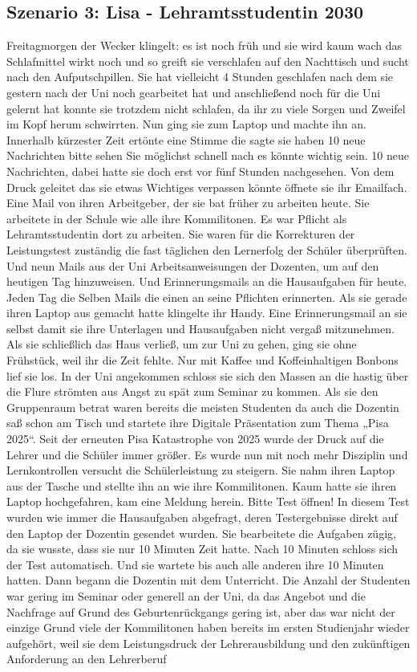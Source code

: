 \documentclass[12pt,a4paper]{article}
\begin{document}
\begin{appendix}
\section{Szenario 3: Lisa - Lehramtsstudentin 2030}
Freitagmorgen der Wecker klingelt: es ist noch früh und sie wird kaum wach das Schlafmittel wirkt noch und so greift sie verschlafen auf den Nachttisch und sucht nach den Aufputschpillen. Sie hat vielleicht 4 Stunden geschlafen nach dem sie gestern nach der Uni noch gearbeitet hat und anschließend noch für die Uni gelernt hat konnte sie trotzdem nicht schlafen, da ihr zu viele Sorgen und Zweifel im Kopf herum schwirrten. Nun ging sie zum Laptop und machte ihn an. Innerhalb kürzester Zeit ertönte eine Stimme die sagte sie haben 10 neue Nachrichten bitte sehen Sie möglichst schnell nach es könnte wichtig sein.  10 neue Nachrichten, dabei hatte sie doch erst vor fünf Stunden nachgesehen.  Von dem Druck geleitet das sie etwas Wichtiges verpassen könnte öffnete sie ihr Emailfach. Eine Mail von ihren Arbeitgeber, der sie bat früher zu arbeiten heute.  Sie arbeitete in der Schule wie alle ihre Kommilitonen. Es war Pflicht als Lehramtsstudentin dort zu arbeiten. Sie waren für die Korrekturen der Leistungstest zuständig die fast täglichen den Lernerfolg der Schüler überprüften. Und neun Mails aus der Uni Arbeitsanweisungen der Dozenten, um auf den heutigen Tag hinzuweisen. Und Erinnerungsmails an die Hausaufgaben für heute. Jeden Tag die Selben Mails die einen  an seine Pflichten erinnerten. Als sie gerade ihren Laptop aus gemacht hatte klingelte ihr Handy. Eine Erinnerungsmail an sie selbst damit sie ihre Unterlagen und Hausaufgaben nicht vergaß mitzunehmen. Als sie schließlich das Haus verließ, um zur Uni zu gehen, ging sie ohne Frühstück, weil ihr die Zeit fehlte. Nur mit Kaffee und Koffeinhaltigen Bonbons lief sie los. In der Uni angekommen schloss sie sich den Massen an die hastig über die Flure strömten aus Angst zu spät zum Seminar zu kommen.  Als sie den Gruppenraum betrat waren bereits die meisten Studenten da auch die Dozentin saß schon am Tisch und startete ihre Digitale Präsentation zum Thema „Pisa 2025“. Seit der erneuten Pisa Katastrophe von 2025 wurde der Druck auf die Lehrer und die Schüler immer größer. Es wurde nun mit noch mehr Disziplin und Lernkontrollen versucht die Schülerleistung zu steigern. Sie nahm ihren Laptop aus der Tasche und stellte ihn an wie ihre Kommilitonen.  Kaum hatte sie ihren Laptop hochgefahren, kam eine Meldung herein. Bitte Test öffnen! In diesem Test wurden wie immer die Hausaufgaben abgefragt, deren Testergebnisse  direkt auf den Laptop der Dozentin gesendet wurden.  Sie bearbeitete die Aufgaben zügig, da sie wusste, dass sie nur 10 Minuten Zeit hatte. Nach 10 Minuten schloss sich der Test automatisch. Und sie wartete bis auch alle anderen ihre 10 Minuten hatten. Dann begann die Dozentin mit dem Unterricht. Die Anzahl der Studenten war gering im Seminar oder generell an der Uni, da das Angebot und die Nachfrage auf Grund des Geburtenrückgangs gering ist, aber das war nicht der einzige Grund viele der Kommilitonen haben bereits im ersten Studienjahr wieder aufgehört, weil sie dem Leistungsdruck der Lehrerausbildung und den zukünftigen Anforderung an den Lehrerberuf 
\end{appendix}
\end{document}
